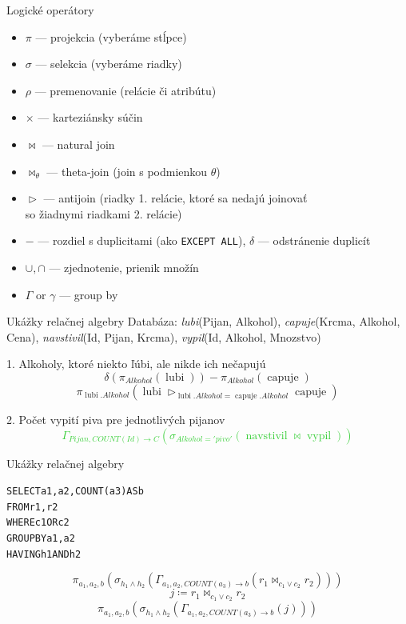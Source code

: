 \documentclass[12pt]{beamer}
\def\blue#1{\textcolor{Cerulean}{#1}}
\def\green#1{\textcolor{LimeGreen}{#1}}
\DeclareMathOperator{\join}{\bowtie}
\DeclareMathOperator{\antijoin}{\rhd}
\DeclareMathOperator{\lubi}{lubi}
\DeclareMathOperator{\capuje}{capuje}
\DeclareMathOperator{\navstivil}{navstivil}
\DeclareMathOperator{\vypil}{vypil}
\begin{document}
\begin{frame}[fragile]{Logické operátory}
\begin{itemize}
    \item $\pi$ --- projekcia (vyberáme stĺpce)
    \item $\sigma$ --- selekcia (vyberáme riadky)
    \item $\rho$ --- premenovanie (relácie či atribútu)
    \item $\times$ --- karteziánsky súčin
    \item $\bowtie$ --- natural join
    \item $\bowtie_\theta$ --- theta-join (join s podmienkou $\theta$)
    \item $\antijoin$ --- antijoin (riadky 1. relácie, ktoré sa nedajú joinovať\\ \hskip 2.5cm so žiadnymi riadkami 2. relácie)
    \item $-$ --- rozdiel s duplicitami (ako \texttt{EXCEPT ALL}), $\delta$ --- odstránenie duplicít
    \item $\cup, \cap$ --- zjednotenie, prienik množín
    \item $\Gamma$ or $\gamma$ --- group by
\end{itemize}
\end{frame}

\begin{frame}[fragile]{Ukážky relačnej algebry}
Databáza: \emph{lubi}(Pijan, Alkohol), \emph{capuje}(Krcma, Alkohol, Cena),
\emph{navstivil}(Id, Pijan, Krcma), \emph{vypil}(Id, Alkohol, Mnozstvo)

\bigskip

1. Alkoholy, ktoré niekto ľúbi, ale nikde ich nečapujú
\blue{
$$
    \delta(\pi_{Alkohol} (\lubi)) - \pi_{Alkohol}(\capuje)
$$
$$
    \pi_{\lubi.Alkohol} (\lubi\antijoin_{\lubi.Alkohol = \capuje.Alkohol} \capuje)
$$
}

2. Počet vypití piva pre jednotlivých pijanov
\green{
$$
    \Gamma_{Pijan, COUNT(Id)\rightarrow C}(\sigma_{Alkohol='pivo'}(\navstivil\join\vypil))
$$
}
\end{frame}

\begin{frame}[fragile]{Ukážky relačnej algebry}
\begin{alltt}
SELECT a1, a2, COUNT(a3) AS b
FROM r1, r2
WHERE c1 OR c2
GROUP BY a1, a2
HAVING h1 AND h2
\end{alltt}
$$
    \pi_{a_1, a_2, b}(\sigma_{h_1\land h_2}(\Gamma_{a_1, a_2, COUNT(a_3)\rightarrow b} (r_1\bowtie_{c_1 \lor c_2} r_2)))
$$
\bigskip
$$j \coloneqq r_1\bowtie_{c_1 \lor c_2} r_2$$
$$\pi_{a_1, a_2, b}(\sigma_{h_1\land h_2}(\Gamma_{a_1, a_2, COUNT(a_3)\rightarrow b} (j)))$$
\end{frame}
\end{document}
